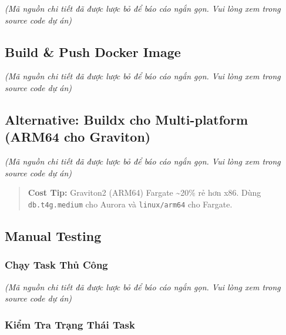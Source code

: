 \emph{(Mã nguồn chi tiết đã được lược bỏ để báo cáo ngắn gọn. Vui lòng
xem trong source code dự án)}

\hypertarget{build-push-docker-image}{%
\subsection{Build \& Push Docker Image}}

\emph{(Mã nguồn chi tiết đã được lược bỏ để báo cáo ngắn gọn. Vui lòng
xem trong source code dự án)}

\hypertarget{alternative-buildx-cho-multi-platform-arm64-cho-graviton}{%
\subsection{Alternative: Buildx cho Multi-platform (ARM64 cho
Graviton)}}

\emph{(Mã nguồn chi tiết đã được lược bỏ để báo cáo ngắn gọn. Vui lòng
xem trong source code dự án)}

\begin{quote}
\textbf{Cost Tip:} Graviton2 (ARM64) Fargate \textasciitilde20\% rẻ hơn
x86. Dùng \texttt{db.t4g.medium} cho Aurora và \texttt{linux/arm64} cho
Fargate.
\end{quote}

\hypertarget{manual-testing}{%
\subsection{Manual Testing}}

\hypertarget{chux1ea1y-task-thux1ee7-cuxf4ng}{%
\subsubsection{Chạy Task Thủ
Công}}

\emph{(Mã nguồn chi tiết đã được lược bỏ để báo cáo ngắn gọn. Vui lòng
xem trong source code dự án)}

\hypertarget{kiux1ec3m-tra-trux1ea1ng-thuxe1i-task}{%
\subsubsection{Kiểm Tra Trạng Thái
Task}}

